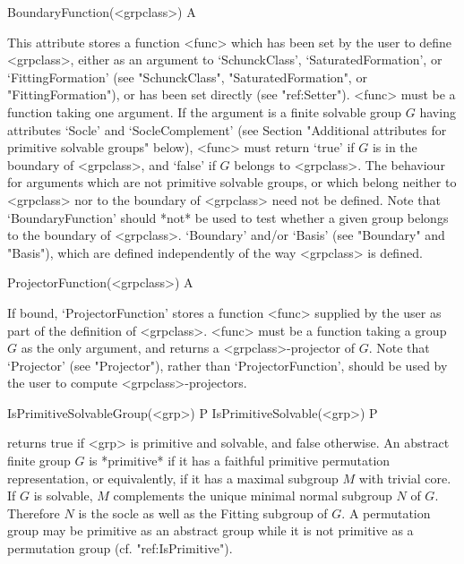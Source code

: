 \>BoundaryFunction(<grpclass>)                                  A

This attribute stores a function <func> which has been set by the 
user to define <grpclass>, either as an argument to `SchunckClass', 
`SaturatedFormation', or `FittingFormation' (see "SchunckClass", 
"SaturatedFormation", or "FittingFormation"), or has been set directly
(see "ref:Setter"). <func> must be a function taking one argument.
If the argument is a finite solvable group $G$ having attributes 
`Socle' and `SocleComplement' (see Section "Additional attributes for 
primitive solvable groups" below), <func> must  return `true' if $G$ 
is in the boundary of <grpclass>, and `false' if $G$ belongs to 
<grpclass>. The behaviour for arguments which are not primitive 
solvable groups, or which  belong neither to <grpclass> nor to the 
boundary of <grpclass> need not be defined. Note that 
`BoundaryFunction' should *not* be used to test whether a given group 
belongs to the boundary of <grpclass>. `Boundary' and/or `Basis' (see 
"Boundary" and "Basis"), which are defined independently of the way 
<grpclass> is defined.


\>ProjectorFunction(<grpclass>) A

If bound, `ProjectorFunction' stores a function <func> supplied by the
user as part of the definition of <grpclass>. <func> must be a function
taking a group
$G$ as the only argument, and returns a <grpclass>-projector of $G$.  Note that
`Projector' (see "Projector"),
rather than `ProjectorFunction', should be used by the user to compute
<grpclass>-projectors.


\null




\>IsPrimitiveSolvableGroup(<grp>) P
\>IsPrimitiveSolvable(<grp>) P

returns true if <grp> is primitive and solvable, and false otherwise.
An abstract finite group $G$ is *primitive* if it has a faithful primitive permutation 
representation, or equivalently, if it has a maximal subgroup $M$ with trivial 
core. If $G$ is solvable, $M$ complements the unique minimal normal subgroup
$N$ of $G$. Therefore $N$ is the socle as well as the Fitting subgroup of
$G$. A permutation group may be primitive as an abstract group while it is 
not primitive as a permutation group (cf. "ref:IsPrimitive").


